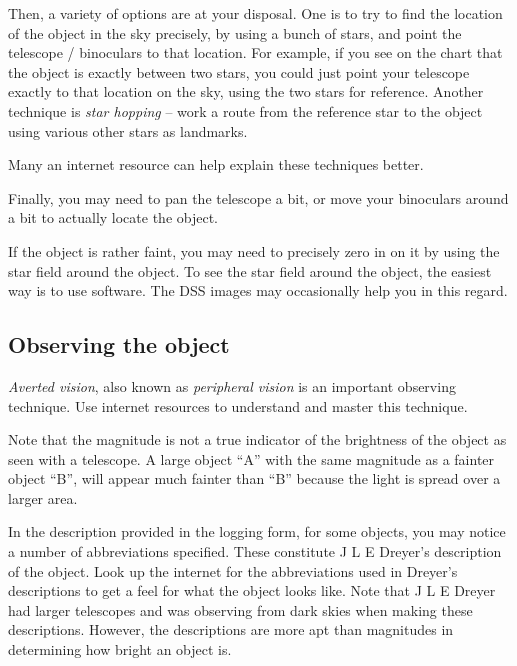 Then, a variety of options are at your disposal. One is to try to find
the location of the object in the sky precisely, by using a bunch of
stars, and point the telescope / binoculars to that location. For
example, if you see on the chart that the object is exactly between
two stars, you could just point your telescope exactly to that
location on the sky, using the two stars for reference. Another
technique is \emph{star hopping} -- work a route from the reference
star to the object using various other stars as landmarks.

Many an internet resource can help explain these techniques better.

Finally, you may need to pan the telescope a bit, or move your
binoculars around a bit to actually locate the object.

If the object is rather faint, you may need to precisely zero in on it
by using the star field around the object. To see the star field
around the object, the easiest way is to use software. The DSS images
may occasionally help you in this regard.

\subsection{Observing the object}

\emph{Averted vision}, also known as \emph{peripheral vision} is an
important observing technique. Use internet resources to understand
and master this technique.

Note that the magnitude is not a true indicator of the brightness of
the object as seen with a telescope. A large object ``A'' with the
same magnitude as a fainter object ``B'', will appear much fainter
than ``B'' because the light is spread over a larger area.

In the description provided in the logging form, for some objects, you
may notice a number of abbreviations specified. These constitute J L E
Dreyer's description of the object. Look up the internet for the
abbreviations used in Dreyer's descriptions to get a feel for what the
object looks like. Note that J L E Dreyer had larger telescopes and
was observing from dark skies when making these descriptions. However,
the descriptions are more apt than magnitudes in determining how
bright an object is.

